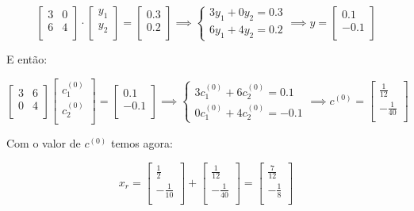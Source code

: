\documentclass[11pt]{article}
\begin{document}
\begin{exerc}
\begin{enumerate}[a.]
$$\begin{bmatrix}
	3 & 0\\
	6 & 4\\
\end{bmatrix}
\cdot
\begin{bmatrix}
	y_1\\
	y_2\\
\end{bmatrix}
=
\begin{bmatrix}
	0.3\\
	0.2\\
\end{bmatrix}
\implies
\begin{cases}
3y_1 + 0y_2 = 0.3\\
6y_1 + 4y_2 = 0.2
\end{cases}
\implies
y
=
\begin{bmatrix}
	0.1\\
	-0.1\\
\end{bmatrix}
$$

E então:

$$
\begin{bmatrix}
	3 & 6\\
	0 & 4\\
\end{bmatrix}
\begin{bmatrix}
	c^{(0)}_1\\
	c^{(0)}_2\\
\end{bmatrix}
=
\begin{bmatrix}
	0.1\\
	-0.1\\
\end{bmatrix}
\implies
\begin{cases}
3c^{(0)}_1 + 6c^{(0)}_2 = 0.1\\
0c^{(0)}_1 + 4c^{(0)}_2 = -0.1
\end{cases}
\implies
c^{(0)}
=
\begin{bmatrix}
	\frac{1}{12}\\
	-\frac{1}{40}\\
\end{bmatrix}
$$

Com o valor de $c^{(0)}$ temos agora:

$$x_r =
\begin{bmatrix}
	\frac{1}{2}\\
	-\frac{1}{10}\\
\end{bmatrix}
+
\begin{bmatrix}
	\frac{1}{12}\\
	-\frac{1}{40}\\
\end{bmatrix}
=
\begin{bmatrix}
	\frac{7}{12}\\
	-\frac{1}{8}\\
\end{bmatrix}$$

\end{enumerate}
\end{exerc}
\end{document}
